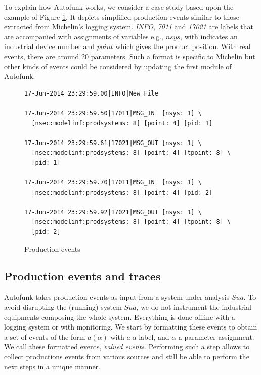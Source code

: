 To explain how Autofunk works, we consider a case study based
upon the example of Figure \ref{fig:rawdatum}. It depicts
simplified production events similar to those extracted from
Michelin's logging system. \textit{INFO}, \textit{7011} and
\textit{17021} are labels that are accompanied with assignments
of variables e.g., $nsys$, with indicates an industrial device
number and $point$ which gives the product position. With real
events, there are around 20 parameters. Such a format is specific
to Michelin but other kinds of events could be considered by
updating the first module of Autofunk.

\begin{figure}[ht]
\begin{framed}
\begin{BVerbatim}
17-Jun-2014 23:29:59.00|INFO|New File

17-Jun-2014 23:29:59.50|17011|MSG_IN  [nsys: 1] \
  [nsec:modelinf:prodsystems: 8] [point: 4] [pid: 1]

17-Jun-2014 23:29:59.61|17021|MSG_OUT [nsys: 1] \
  [nsec:modelinf:prodsystems: 8] [point: 4] [tpoint: 8] \
  [pid: 1]

17-Jun-2014 23:29:59.70|17011|MSG_IN  [nsys: 1] \
  [nsec:modelinf:prodsystems: 8] [point: 4] [pid: 2]

17-Jun-2014 23:29:59.92|17021|MSG_OUT [nsys: 1] \
  [nsec:modelinf:prodsystems: 8] [point: 4] [tpoint: 8] \
  [pid: 2]
\end{BVerbatim}
\end{framed}

\caption{Production events}
\label{fig:rawdatum}
\end{figure}

\subsection{Production events and traces}
\label{part3:collecting}

Autofunk takes production events as input from a system under
analysis $\mathit{Sua}$. To avoid disrupting the (running) system $\mathit{Sua}$,
we do not instrument the industrial equipments composing the
whole system. Everything is done offline with a logging system or
with monitoring. We start by formatting these events to obtain a
set of events of the form $a(\alpha)$ with $a$ a label, and
$\alpha$ a parameter assignment. We call these formatted events,
\textit{valued events}. Performing such a step allows to collect
productions events from various sources and still be able to
perform the next steps in a unique manner.

